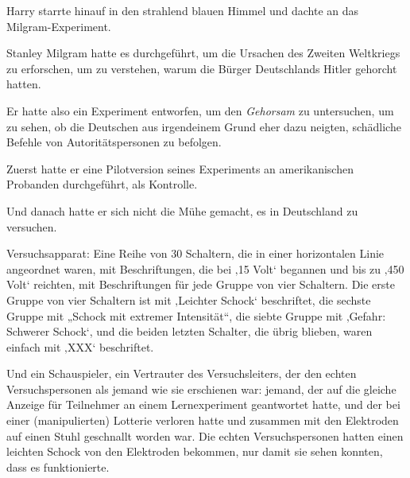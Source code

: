 Harry starrte hinauf in den strahlend blauen Himmel und dachte an das Milgram-Experiment.

Stanley Milgram hatte es durchgeführt, um die Ursachen des Zweiten Weltkriegs zu erforschen, um zu verstehen, warum die Bürger Deutschlands Hitler gehorcht hatten.

Er hatte also ein Experiment entworfen, um den \emph{Gehorsam} zu untersuchen, um zu sehen, ob die Deutschen aus irgendeinem Grund eher dazu neigten, schädliche Befehle von Autoritätspersonen zu befolgen.

Zuerst hatte er eine Pilotversion seines Experiments an amerikanischen Probanden durchgeführt, als Kontrolle.

Und danach hatte er sich nicht die Mühe gemacht, es in Deutschland zu versuchen.

Versuchsapparat: Eine Reihe von 30 Schaltern, die in einer horizontalen Linie angeordnet waren, mit Beschriftungen, die bei ‚15 Volt‘ begannen und bis zu ‚450 Volt‘ reichten, mit Beschriftungen für jede Gruppe von vier Schaltern. Die erste Gruppe von vier Schaltern ist mit ‚Leichter Schock‘ beschriftet, die sechste Gruppe mit
„Schock mit extremer Intensität“, die siebte Gruppe mit ‚Gefahr: Schwerer Schock‘, und die beiden letzten Schalter, die übrig blieben, waren einfach mit ‚XXX‘ beschriftet.

Und ein Schauspieler, ein Vertrauter des Versuchsleiters, der den echten Versuchspersonen als jemand wie sie erschienen war: jemand, der auf die gleiche Anzeige für Teilnehmer an einem Lernexperiment geantwortet hatte, und der bei einer (manipulierten) Lotterie verloren hatte und zusammen mit den Elektroden auf einen Stuhl geschnallt worden war. Die echten Versuchspersonen hatten einen leichten Schock von den Elektroden bekommen, nur damit sie sehen konnten, dass es funktionierte.

